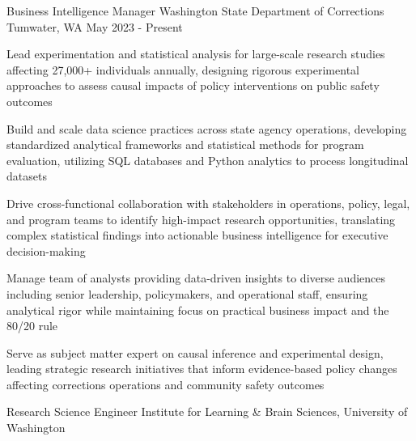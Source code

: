 

\begin{cventries}

  \cventry
  {Business Intelligence Manager}
  {Washington State Department of Corrections}
  {Tumwater, WA}
  {May 2023 - Present}
  {
    \begin{cvitems}
      \vspace{2mm}
      \item Lead experimentation and statistical analysis for large-scale research studies affecting 27,000+ individuals annually, designing rigorous experimental approaches to assess causal impacts of policy interventions on public safety outcomes
      \item Build and scale data science practices across state agency operations, developing standardized analytical frameworks and statistical methods for program evaluation, utilizing SQL databases and Python analytics to process longitudinal datasets
      \item Drive cross-functional collaboration with stakeholders in operations, policy, legal, and program teams to identify high-impact research opportunities, translating complex statistical findings into actionable business intelligence for executive decision-making
      \item Manage team of analysts providing data-driven insights to diverse audiences including senior leadership, policymakers, and operational staff, ensuring analytical rigor while maintaining focus on practical business impact and the 80/20 rule
      \item Serve as subject matter expert on causal inference and experimental design, leading strategic research initiatives that inform evidence-based policy changes affecting corrections operations and community safety outcomes
    \end{cvitems}
    \vspace{2mm}
  }
  \cventry
  {Research Science Engineer} %
  {Institute for Learning \& Brain Sciences, University of Washington} %

\end{cventries}
